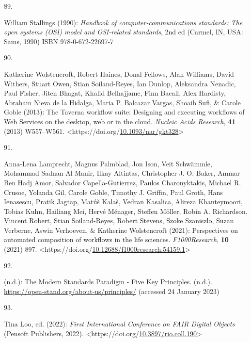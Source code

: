 \begin{thebibliography}{9}
\hypertarget{ref-stallingsHandbookComputercommunicationsStandards1990}{}
89.

William Stallings (1990): \emph{Handbook of computer-communications
standards: {The} open systems ({OSI}) model and {OSI-related}
standards}, 2nd ed ({Carmel, IN, USA}: {Sams}, 1990) ISBN
978-0-672-22697-7

\hypertarget{ref-wolstencroftTavernaWorkflowSuite2013d}{}
90.

Katherine Wolstencroft, Robert Haines, Donal Fellows, Alan Williams,
David Withers, Stuart Owen, Stian Soiland-Reyes, Ian Dunlop, Aleksandra
Nenadic, Paul Fisher, Jiten Bhagat, Khalid Belhajjame, Finn Bacall, Alex
Hardisty, Abraham Nieva de la Hidalga, Maria P. Balcazar Vargas, Shoaib
Sufi, \& Carole Goble (2013): The {Taverna} workflow suite: Designing
and executing workflows of {Web Services} on the desktop, web or in the
cloud. \emph{Nucleic Acids Research}, \textbf{41} (2013) W557--W561.
\textless https://doi.org/\href{https://doi.org/10.1093/nar/gkt328}{10.1093/nar/gkt328}\textgreater{}

\hypertarget{ref-lamprechtPerspectivesAutomatedComposition2021b}{}
91.

Anna-Lena Lamprecht, Magnus Palmblad, Jon Ison, Veit Schwämmle, Mohammad
Sadnan Al Manir, Ilkay Altintas, Christopher J. O. Baker, Ammar Ben Hadj
Amor, Salvador Capella-Gutierrez, Paulos Charonyktakis, Michael R.
Crusoe, Yolanda Gil, Carole Goble, Timothy J. Griffin, Paul Groth, Hans
Ienasescu, Pratik Jagtap, Matúš Kalaš, Vedran Kasalica, Alireza
Khanteymoori, Tobias Kuhn, Hailiang Mei, Hervé Ménager, Steffen Möller,
Robin A. Richardson, Vincent Robert, Stian Soiland-Reyes, Robert
Stevens, Szoke Szaniszlo, Suzan Verberne, Aswin Verhoeven, \& Katherine
Wolstencroft (2021): Perspectives on automated composition of workflows
in the life sciences. \emph{F1000Research}, \textbf{10} (2021) 897.
\textless https://doi.org/\href{https://doi.org/10.12688/f1000research.54159.1}{10.12688/f1000research.54159.1}\textgreater{}

\hypertarget{ref-ModernStandardsParadigm}{}
92.

(n.d.): The {Modern Standards Paradigm} - {Five Key Principles}. (n.d.).
\url{https://open-stand.org/about-us/principles/} (accessed 24 January
2023)

\hypertarget{ref-looFirstInternationalConference2022}{}
93.

Tina Loo, ed. (2022): \emph{First {International Conference} on {FAIR
Digital Objects}} ({Pensoft Publishers}, 2022).
\textless https://doi.org/\href{https://doi.org/10.3897/rio.coll.190}{10.3897/rio.coll.190}\textgreater{}


\end{thebibliography}
